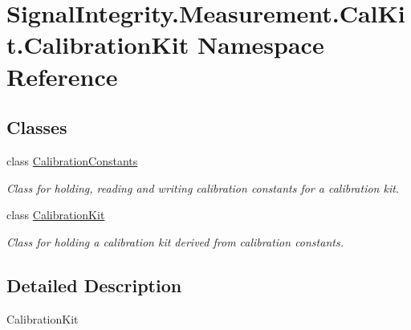 \hypertarget{namespaceSignalIntegrity_1_1Measurement_1_1CalKit_1_1CalibrationKit}{}\section{Signal\+Integrity.\+Measurement.\+Cal\+Kit.\+Calibration\+Kit Namespace Reference}
\label{namespaceSignalIntegrity_1_1Measurement_1_1CalKit_1_1CalibrationKit}
\subsection*{Classes}
\begin{DoxyCompactItemize}
\item 
class \hyperlink{classSignalIntegrity_1_1Measurement_1_1CalKit_1_1CalibrationKit_1_1CalibrationConstants}{Calibration\+Constants}
\begin{DoxyCompactList}\small\item\em Class for holding, reading and writing calibration constants for a calibration kit. \end{DoxyCompactList}\item 
class \hyperlink{classSignalIntegrity_1_1Measurement_1_1CalKit_1_1CalibrationKit_1_1CalibrationKit}{Calibration\+Kit}
\begin{DoxyCompactList}\small\item\em Class for holding a calibration kit derived from calibration constants. \end{DoxyCompactList}\end{DoxyCompactItemize}


\subsection{Detailed Description}
\begin{DoxyVerb}CalibrationKit\end{DoxyVerb}
 